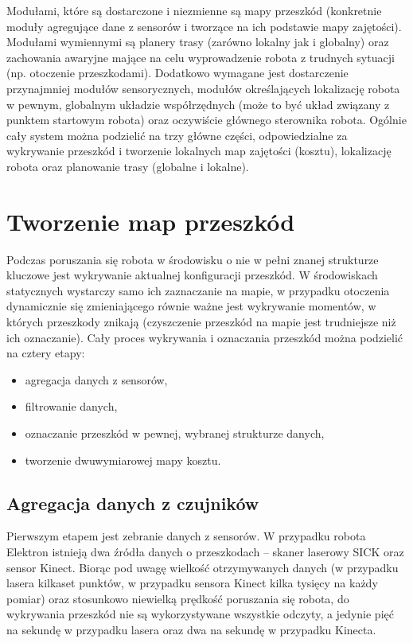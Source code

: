 Modułami, które są dostarczone i niezmienne są mapy przeszkód (konkretnie
moduły agregujące dane z sensorów i tworzące na ich podstawie mapy zajętości).
Modułami wymiennymi są planery trasy (zarówno lokalny jak i globalny) oraz
zachowania awaryjne mające na celu wyprowadzenie robota z trudnych sytuacji
(np. otoczenie przeszkodami). Dodatkowo wymagane jest dostarczenie przynajmniej
modułów sensorycznych, modułów określających lokalizację robota w pewnym,
globalnym układzie współrzędnych (może to być układ związany z punktem startowym
robota) oraz oczywiście głównego sterownika robota. Ogólnie cały system można
podzielić na trzy główne części, odpowiedzialne za wykrywanie przeszkód i
tworzenie lokalnych map zajętości (kosztu), lokalizację robota oraz planowanie
trasy (globalne i lokalne).

\section{Tworzenie map przeszkód}

Podczas poruszania się robota w środowisku o nie w pełni znanej strukturze
kluczowe jest wykrywanie aktualnej konfiguracji przeszkód. W środowiskach
statycznych wystarczy samo ich zaznaczanie na mapie, w przypadku otoczenia
dynamicznie się zmieniającego równie ważne jest wykrywanie momentów, w których
przeszkody znikają (czyszczenie przeszkód na mapie jest trudniejsze niż ich
oznaczanie). Cały proces wykrywania i oznaczania przeszkód można podzielić na
cztery etapy:

\begin{itemize}
  \item agregacja danych z sensorów,
  \item filtrowanie danych,
  \item oznaczanie przeszkód w pewnej, wybranej strukturze danych,
  \item tworzenie dwuwymiarowej mapy kosztu.
\end{itemize}

\subsection{Agregacja danych z czujników}

Pierwszym etapem jest zebranie danych z sensorów. W przypadku robota Elektron
istnieją dwa źródła danych o przeszkodach -- skaner laserowy SICK oraz sensor
Kinect. Biorąc pod uwagę wielkość otrzymywanych danych (w przypadku lasera
kilkaset punktów, w przypadku sensora Kinect kilka tysięcy na każdy pomiar) oraz
stosunkowo niewielką prędkość poruszania się robota, do wykrywania przeszkód
nie są wykorzystywane wszystkie odczyty, a jedynie pięć na sekundę w przypadku
lasera oraz dwa na sekundę w przypadku Kinecta. 

